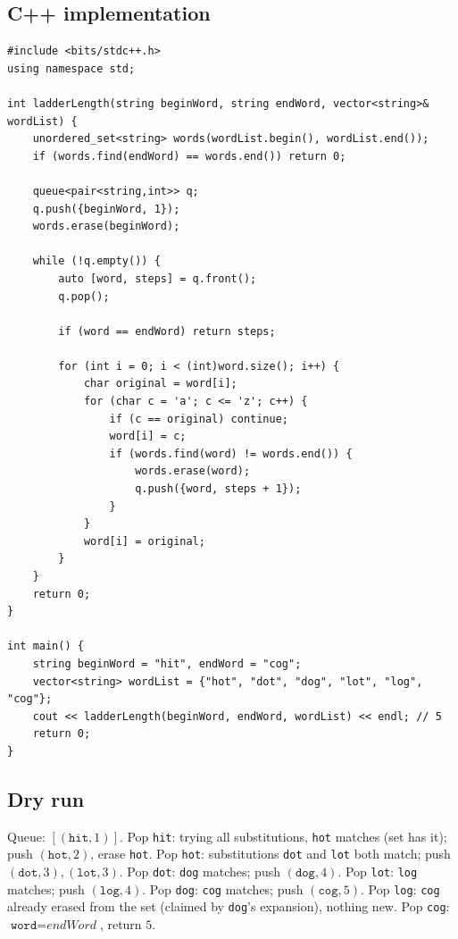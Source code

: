 \subsection*{C++ implementation}

\begin{lstlisting}
#include <bits/stdc++.h>
using namespace std;

int ladderLength(string beginWord, string endWord, vector<string>& wordList) {
    unordered_set<string> words(wordList.begin(), wordList.end());
    if (words.find(endWord) == words.end()) return 0;

    queue<pair<string,int>> q;
    q.push({beginWord, 1});
    words.erase(beginWord);

    while (!q.empty()) {
        auto [word, steps] = q.front();
        q.pop();

        if (word == endWord) return steps;

        for (int i = 0; i < (int)word.size(); i++) {
            char original = word[i];
            for (char c = 'a'; c <= 'z'; c++) {
                if (c == original) continue;
                word[i] = c;
                if (words.find(word) != words.end()) {
                    words.erase(word);
                    q.push({word, steps + 1});
                }
            }
            word[i] = original;
        }
    }
    return 0;
}

int main() {
    string beginWord = "hit", endWord = "cog";
    vector<string> wordList = {"hot", "dot", "dog", "lot", "log", "cog"};
    cout << ladderLength(beginWord, endWord, wordList) << endl; // 5
    return 0;
}
\end{lstlisting}

\subsection*{Dry run}


Queue: $[(\texttt{hit},1)]$. Pop \texttt{hit}: trying all
substitutions, \texttt{hot} matches (set has it); push
$(\texttt{hot},2)$, erase \texttt{hot}. Pop \texttt{hot}: substitutions
\texttt{dot} and \texttt{lot} both match; push
$(\texttt{dot},3),(\texttt{lot},3)$. Pop \texttt{dot}: \texttt{dog}
matches; push $(\texttt{dog},4)$. Pop \texttt{lot}: \texttt{log}
matches; push $(\texttt{log},4)$. Pop \texttt{dog}: \texttt{cog}
matches; push $(\texttt{cog},5)$. Pop \texttt{log}: \texttt{cog}
already erased from the set (claimed by \texttt{dog}'s expansion),
nothing new. Pop \texttt{cog}: $\texttt{word}=\textit{endWord}$,
return $5$.

